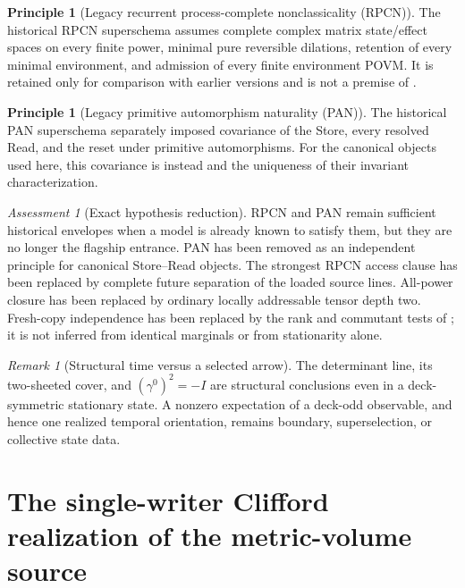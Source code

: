 \documentclass[11pt]{article}
\theoremstyle{definition}
\newtheorem{principle}[theorem]{Principle}
\theoremstyle{remark}
\newtheorem{remark}[theorem]{Remark}
\newtheorem{assessment}[theorem]{Assessment}
\begin{document}
\begin{principle}[Legacy recurrent process-complete nonclassicality (RPCN)]
\label{prin:RPCN}
The historical RPCN superschema assumes complete complex matrix state/effect
spaces on every finite power, minimal pure reversible dilations, retention of
every minimal environment, and admission of every finite environment POVM.
It is retained only for comparison with earlier versions and is not a premise
of .
\end{principle}

\begin{principle}[Legacy primitive automorphism naturality (PAN)]
\label{prin:PAN}
The historical PAN superschema separately imposed covariance of the Store,
every resolved Read, and the reset under primitive automorphisms.  For the
canonical objects used here, this covariance is instead
 and the uniqueness of their
invariant characterization.
\end{principle}

\begin{assessment}[Exact hypothesis reduction]
RPCN and PAN remain sufficient historical envelopes when a model is already
known to satisfy them, but they are no longer the flagship entrance.  PAN has
been removed as an independent principle for canonical Store--Read objects.
The strongest RPCN access clause has been replaced by complete future
separation of the loaded source lines.  All-power closure has been replaced by
ordinary locally addressable tensor depth two.  Fresh-copy independence has
been replaced by the rank and commutant tests of
; it is not inferred from identical marginals or
from stationarity alone.
\end{assessment}

\begin{remark}[Structural time versus a selected arrow]
The determinant line, its two-sheeted cover, and $(\gamma^0)^2=-I$ are
structural conclusions even in a deck-symmetric stationary state.  A nonzero
expectation of a deck-odd observable, and hence one realized temporal
orientation, remains boundary, superselection, or collective state data.
\end{remark}



\section{The single-writer Clifford realization of the metric-volume source}
\label{sec:single-writer-clifford}
\end{document}
